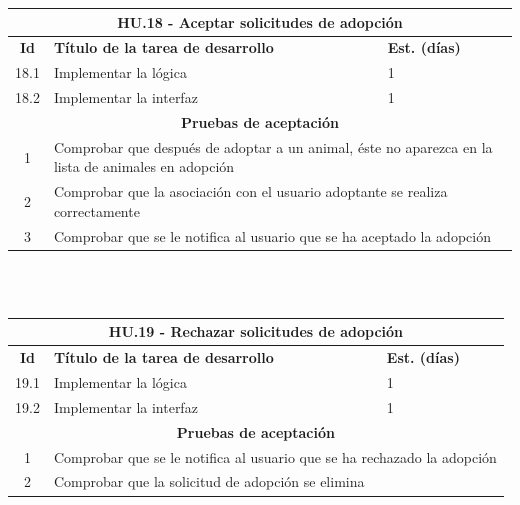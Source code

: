 \begin{tabular}{|c|p{9.5cm}|p{1cm}|}
	\hline
	\multicolumn{3}{|c|}{\textbf{HU.18 - Aceptar solicitudes de adopción}} \\
	\hline
	\textbf{Id} & \textbf{Título de la tarea de desarrollo} & \textbf{Est. (días)} \\
	\hline
	18.1 &  Implementar la lógica & 1 \\ \hline
	18.2 &  Implementar la interfaz & 1 \\ \hline
	\multicolumn{3}{|c|}{\textbf{Pruebas de aceptación}} \\ \hline
	1 & \multicolumn{2}{|p{12cm}|}{Comprobar que después de adoptar a un animal, éste no aparezca en la lista de animales en adopción} \\ \hline
	2 & \multicolumn{2}{|p{12cm}|}{Comprobar que la asociación con el usuario adoptante se realiza correctamente} \\ \hline
	3 & \multicolumn{2}{|p{12cm}|}{Comprobar que se le notifica al usuario que se ha aceptado la adopción} \\ \hline

	
\end{tabular} \\ \\

\begin{tabular}{|c|p{9.5cm}|p{1cm}|}
	\hline
	\multicolumn{3}{|c|}{\textbf{HU.19 - Rechazar solicitudes de adopción}} \\
	\hline
	\textbf{Id} & \textbf{Título de la tarea de desarrollo} & \textbf{Est. (días)} \\
	\hline
	19.1 &  Implementar la lógica & 1 \\ \hline
	19.2 &  Implementar la interfaz & 1 \\ \hline
	\multicolumn{3}{|c|}{\textbf{Pruebas de aceptación}} \\ \hline
	1 & \multicolumn{2}{|p{12cm}|}{Comprobar que se le notifica al usuario que se ha rechazado la adopción} \\ \hline
	2 & \multicolumn{2}{|p{12cm}|}{Comprobar que la solicitud de adopción se elimina} \\ \hline
	
	
\end{tabular} \\ \\


